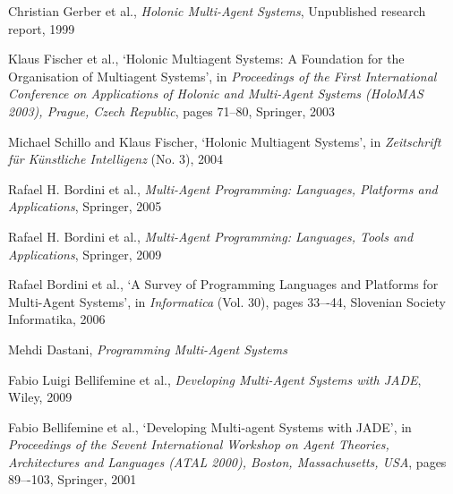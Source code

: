 \begin{thebibliography}{99}
Christian Gerber et al., %
\textit{Holonic Multi-Agent Systems},
Unpublished research report, 1999

Klaus Fischer et al., %
`Holonic Multiagent Systems: A Foundation for the Organisation of Multiagent Systems',
in \textit{Proceedings of the First International Conference on Applications of Holonic and Multi-Agent Systems (HoloMAS 2003), Prague, Czech Republic},
pages 71--80,
Springer, 2003

Michael Schillo and Klaus Fischer,
`Holonic Multiagent Systems',
in \textit{Zeitschrift für Künstliche Intelligenz} (No. 3),
2004


Rafael H. Bordini et al., %
\textit{Multi-Agent Programming: Languages, Platforms and Applications},
Springer, 2005

Rafael H. Bordini et al., %
\textit{Multi-Agent Programming: Languages, Tools and Applications},
Springer, 2009

Rafael Bordini et al.,
`A Survey of Programming Languages and Platforms for Multi-Agent Systems',
in \textit{Informatica} (Vol. 30),
pages 33–-44,
Slovenian Society Informatika, 2006

Mehdi Dastani,
\textit{Programming Multi-Agent Systems}


Fabio Luigi Bellifemine et al., %
\textit{Developing Multi-Agent Systems with JADE},
Wiley, 2009

Fabio Bellifemine et al., %
`Developing Multi-agent Systems with JADE',
in \textit{Proceedings of the Sevent International Workshop on Agent Theories, Architectures and Languages (ATAL 2000), Boston, Massachusetts, USA},
pages 89–-103,
Springer, 2001


\end{thebibliography}
